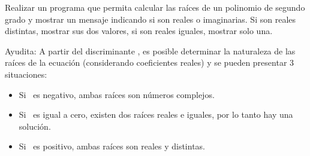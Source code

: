 Realizar un programa que permita calcular las raíces de un polinomio de segundo grado y mostrar un mensaje indicando si son reales o imaginarias. Si son reales distintas, mostrar sus dos valores, si son reales iguales, mostrar solo una.

Ayudita: A partir del discriminante \Delta, es posible determinar la naturaleza de las raíces de la ecuación (considerando coeficientes reales) y se pueden presentar 3 situaciones:

\begin{itemize}
	\item Si \Delta\ es negativo, ambas raíces son números complejos.
	\item Si \Delta\ es igual a cero, existen dos raíces reales e iguales, por lo tanto hay una solución.
	\item Si \Delta\ es positivo, ambas raíces son reales y distintas.
\end{itemize}